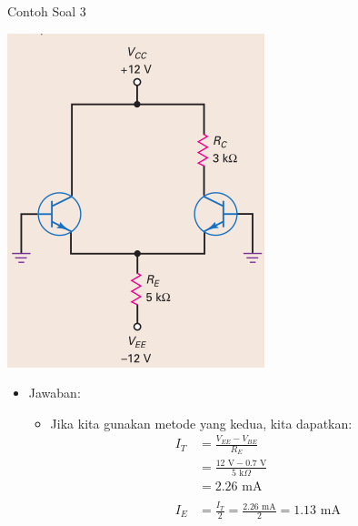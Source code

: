 \documentclass[aspectratio=169]{beamer}
\begin{document}
\begin{frame}{Contoh Soal 3}
	\begin{multicols}{2}
		\begin{center}
			\includegraphics[width=0.6\textheight]{gambar/01.diff-amp/01.latihan_soal_3}
		\end{center}
		\columnbreak
		\begin{itemize}
			\item Jawaban:
			\begin{itemize}
				\item Jika kita gunakan metode yang kedua, kita dapatkan:
				\begin{align*}
					I_T &= \frac{V_{EE} - V_{BE}}{R_E} \\
					&= \frac{12 \text{ V} - 0.7 \text{ V}}{5 \text{ k}\Omega} \\
					&= 2.26 \text{ mA} \\
					\\
					I_E &= \frac{I_T}{2} = \frac{2.26 \text{ mA}}{2} = 1.13 \text{ mA}
				\end{align*}
			\end{itemize}
		\end{itemize}
		\vfill\null
	\end{multicols}
\end{frame}
\end{document}
